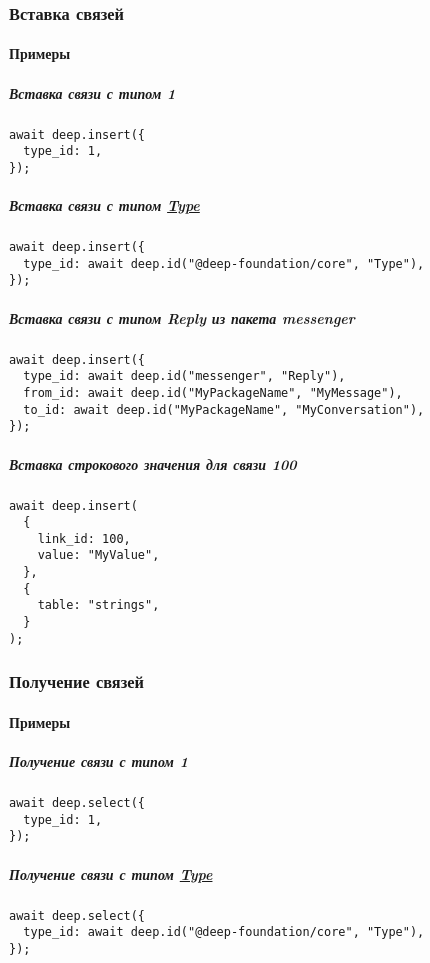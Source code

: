 \documentclass{article}
\begin{document}
\subsubsection{Вставка связей}

\paragraph{Примеры}

\subparagraph{Вставка связи с типом 1}
\begin{lstlisting}
await deep.insert({
  type_id: 1,
});
\end{lstlisting}

\subparagraph{Вставка связи с типом \hyperlink{Core.Type.Description}{Type}}
\begin{lstlisting}
await deep.insert({
  type_id: await deep.id("@deep-foundation/core", "Type"),
});
\end{lstlisting}

\subparagraph{Вставка связи с типом Reply из пакета messenger}
\begin{lstlisting}
await deep.insert({
  type_id: await deep.id("messenger", "Reply"),
  from_id: await deep.id("MyPackageName", "MyMessage"),
  to_id: await deep.id("MyPackageName", "MyConversation"),
});
\end{lstlisting}

\subparagraph{Вставка строкового значения для связи 100}
\begin{lstlisting}
await deep.insert(
  {
    link_id: 100,
    value: "MyValue",
  },
  {
    table: "strings",
  }
);
\end{lstlisting}

\subsubsection{Получение связей}

\paragraph{Примеры}

\subparagraph{Получение связи с типом 1}
\begin{lstlisting}
await deep.select({
  type_id: 1,
});
\end{lstlisting}

\subparagraph{Получение связи с типом \hyperlink{Core.Type.Description}{Type}}
\begin{lstlisting}
await deep.select({
  type_id: await deep.id("@deep-foundation/core", "Type"),
});
\end{lstlisting}
\end{document}
